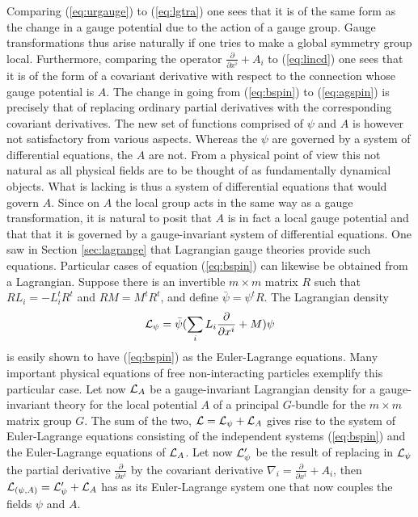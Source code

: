 \documentclass[12pt,titlepage]{article}
\def\cL{{\cal L}}
\def\ppv#1#2{\frac{\partial}{\partial #1^#2}}
\begin{document}
Comparing (\ref{eq:urgauge}) to (\ref{eq:lgtra})
one sees that it is of the same form as the change in a gauge potential
due to the action of a gauge group. Gauge transformations thus arise
naturally if one tries to make a global symmetry group local.
Furthermore, comparing the operator \(\ppv{x}{i}+
A_i\) to (\ref{eq:lincd}) one sees that it is of the form of a
covariant derivative with respect to the connection whose gauge
potential is \(A\).
The change in going from (\ref{eq:bspin}) to
(\ref{eq:agspin}) is precisely that of replacing ordinary partial
derivatives with the corresponding covariant derivatives.
The new set of functions comprised of \(\psi\) and \(A\)
is however not satisfactory
from various aspects. Whereas the \(\psi\) are governed by a system of
differential equations, the \(A\) are not. From a physical point of view
this not natural as all physical fields are to be thought of as
fundamentally dynamical objects.  What is lacking is thus a system of
differential equations that would govern \(A\). Since on \(A\) the local
group acts in the same way as a gauge transformation, it is natural to
posit that \(A\) is in fact a local gauge potential and that that it is
governed by a gauge-invariant system of differential equations.
One saw in Section \ref{sec:lagrange}
that Lagrangian gauge theories provide such equations.  Particular
cases of equation
(\ref{eq:bspin}) can likewise be obtained from a Lagrangian. Suppose
there is an invertible \(m\times m\) matrix \(R\) such that \(RL_i=-
L_i^tR^t\) and \(RM=M^tR^t\), and define \(\bar\psi = \psi^tR\). The
Lagrangian density
\begin{equation}\label{eq:psilag}
\cL_\psi=\bar\psi(\sum_iL_i\ppv{x}{i}+M)\psi
\end{equation}%
is easily shown to have (\ref{eq:bspin}) as the
Euler-Lagrange equations. Many important physical equations of free 
non-interacting  particles exemplify this particular case.
Let now
\(\cL_A\) be a gauge-invariant Lagrangian density for a gauge-invariant
theory for the local potential \(A\) of a principal \(G\)-bundle for the
\(m\times m\) matrix group \(G\). The sum of the two, \(\cL = \cL_\psi +
\cL_A\) gives rise to the system of Euler-Lagrange equations consisting
of the independent systems (\ref{eq:bspin}) and the Euler-Lagrange
equations of \(\cL_A\). Let now \(\cL_\psi'\) be the result of replacing
in \(\cL_\psi\) the partial derivative \(\ppv{x}{i}\)
by the covariant derivative \(\nabla_i=\ppv{x}{i}+
A_i\), then \(\cL_{(\psi,A)}=\cL_\psi' +
\cL_A\) has as its Euler-Lagrange system one that
now couples the fields \(\psi\) and \(A\). 
\end{document}
